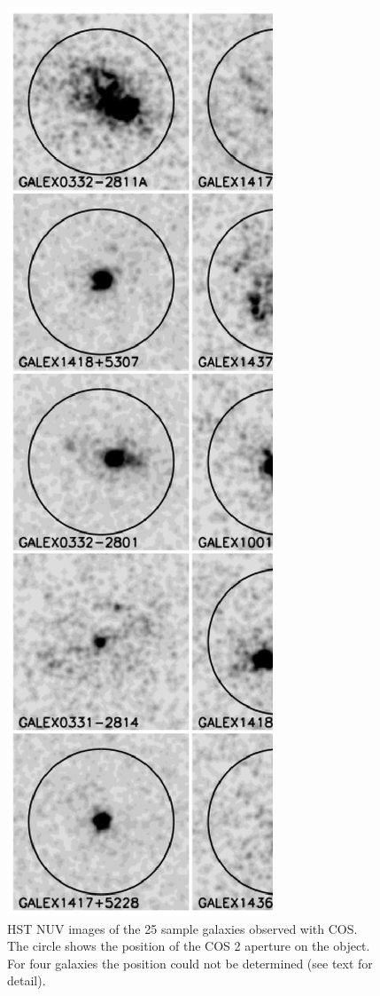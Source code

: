 \documentclass[manuscript]{emulateapj}
\begin{document}
\begin{figure}[t!]
  \centering
  \includegraphics[scale=0.6]{images_COS.ps}
\caption{HST NUV images of the 25 sample galaxies observed with COS. The circle shows the
 position of the COS 2 aperture on the object. For four galaxies the
 position could not be determined (see text for detail).}
  \label{fig:images}
\end{figure}
\end{document}
